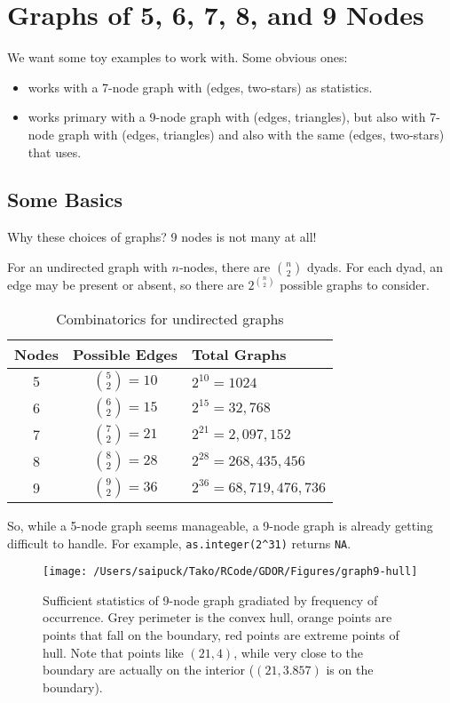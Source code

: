 \documentclass{amsbook}
\theoremstyle{definition}
\theoremstyle{remark}
\begin{document}
\newpage
\section{Graphs of 5, 6, 7, 8, and 9 Nodes}
We want some toy examples to work with.  Some obvious ones:
\begin{itemize}
\item \citet{Handcock:Degeneracy} works with a 7-node graph with (edges, two-stars) as statistics.
\item \citet{Rinaldo:2009} works primary with a 9-node graph with (edges, triangles), but also with 7-node graph with (edges, triangles) and also with the same (edges, two-stars) that \citet{Handcock:Degeneracy} uses.
\end{itemize}

\subsection{Some Basics}
Why these choices of graphs?  9 nodes is not many at all!

For an undirected graph with $n$-nodes, there are $n \choose 2$ dyads.  For each dyad, an edge may be present or absent, so there are $2^{n \choose 2}$ possible graphs to consider.\\

\begin{table}[ht]
\caption{Combinatorics for undirected graphs}
\begin{tabular}{ccl}
\hline 
Nodes & Possible Edges & Total Graphs \\ [1ex]
\hline
5 & ${5 \choose 2} = 10$ & $2^{10} = 1024$ \\ [1ex]
6 & ${6 \choose 2} = 15$ & $2^{15} = 32,768$ \\ [1ex]
7 & ${7 \choose 2} = 21$ & $2^{21} = 2,097,152$ \\ [1ex]
8 & ${8 \choose 2} = 28$ & $2^{28} = 268,435,456$ \\ [1ex]
9 & ${9 \choose 2} = 36$ & $2^{36} = 68,719,476,736$ \\ [1ex]
\hline 
\end{tabular}
\end{table}

So, while a 5-node graph seems manageable, a 9-node graph is already getting difficult to handle.  For example, \texttt{as.integer(2\textasciicircum31)} returns \texttt{NA}.  

\begin{figure}[!h]
\centering
\texttt{[image: /Users/saipuck/Tako/RCode/GDOR/Figures/graph9-hull]}
\caption{Sufficient statistics of 9-node graph gradiated by frequency of occurrence.  Grey perimeter is the convex hull, orange points are points that fall on the boundary, red points are extreme points of hull.  
Note that points like $(21,4)$, while very close to the boundary are actually on the interior ($(21, 3.857)$ is on the boundary).
}
\end{figure}
\end{document}
